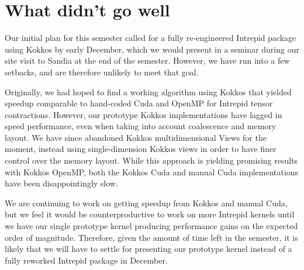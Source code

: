 \documentclass{hmcclinic}
\begin{document}
\section*{What didn't go well}
Our initial plan for this semester called for a fully re-engineered Intrepid
package using Kokkos by early December, which we would present in a seminar
during our site visit to Sandia at the end of the semester.  However, we have
run into a few setbacks, and are therefore unlikely to meet that goal.

Originally, we had hoped to find a working algorithm using Kokkos that yielded
speedup comparable to hand-coded Cuda and OpenMP for Intrepid tensor
contractions.  However, our prototype Kokkos implementations have lagged in
speed performance, even when taking into account coalescence and memory layout.
We have since abandoned Kokkos multidimensional Views for the moment, instead
using single-dimension Kokkos views in order to have finer control over the
memory layout.  While this approach is yielding promising results with Kokkos
OpenMP, both the Kokkos Cuda and manual Cuda implementations have been
disappointingly slow.

We are continuing to work on getting speedup from Kokkos and manual Cuda, but
we feel it would be counterproductive to work on more Intrepid kernels until we
have our single prototype kernel producing performance gains on the expected
order of magnitude.  Therefore, given the amount of time left in the semester,
it is likely that we will have to settle for presenting our prototype kernel
instead of a fully reworked Intrepid package in December. 
\end{document}
